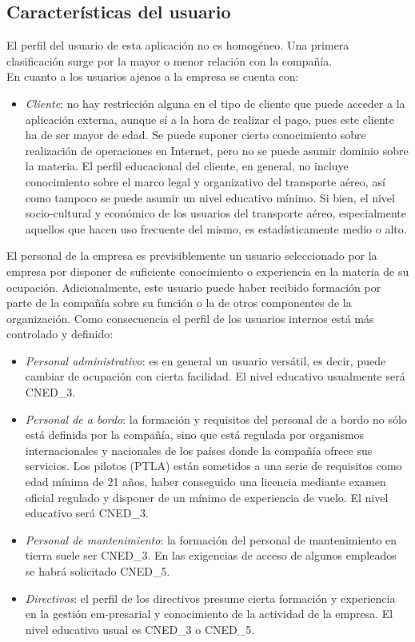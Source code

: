\documentclass[11pt, a4paper, twoside, titlepage]{article}
\begin{document}
		\subsection{Características del usuario}
			El perfil del usuario de esta aplicación no es homogéneo. Una primera clasificación surge por la mayor o menor relación con la compañía.\\
			En cuanto a los usuarios ajenos a la empresa se cuenta con:
	
			\begin{itemize}
				\item \textit{Cliente}: no hay restricción alguna en el tipo de cliente que puede acceder a la aplicación externa, aunque sí a la hora de realizar el pago, pues este cliente ha de ser mayor de edad. Se puede suponer cierto conocimiento sobre realización de operaciones en \gls{Internet}, pero no se puede asumir dominio sobre la materia. El perfil educacional del cliente, en general, no incluye conocimiento sobre el marco legal y organizativo del transporte aéreo, así como tampoco se puede asumir un nivel educativo mínimo. Si bien, el nivel socio-cultural y económico de los usuarios del transporte aéreo, especialmente aquellos que hacen uso frecuente del mismo, es estadísticamente medio o alto.
			\end{itemize}

			El personal de la empresa es previsiblemente un usuario seleccionado por la empresa por disponer de suficiente conocimiento o experiencia en la materia de su ocupación. Adicionalmente, este usuario puede haber recibido formación por parte de la compañía sobre su función o la de otros componentes de la organización. Como consecuencia el perfil de los usuarios internos está más controlado y definido:
			\begin{itemize}
				\item \textit{Personal administrativo}: es en general un usuario versátil, es decir, puede cambiar de ocupación con cierta facilidad. El nivel educativo usualmente será \gls{CNED_3}.
				\item \textit{Personal de a bordo}: la formación y requisitos del personal de a bordo no sólo está definida por la compañía, sino que está regulada por organismos internacionales y nacionales de los países donde la compañía ofrece sus servicios. Los pilotos  (\gls{PTLA}) están sometidos a una serie de requisitos como edad mínima de 21 años, haber conseguido una licencia mediante examen oficial regulado y disponer de un mínimo de experiencia de vuelo. El nivel educativo será \gls{CNED_3}.
				\item \textit{Personal de mantenimiento}: la formación del personal de mantenimiento en tierra suele ser \gls{CNED_3}. En las exigencias de acceso de algunos empleados se habrá solicitado \gls{CNED_5}.
				\item \textit{Directivos}: el perfil de los directivos presume cierta formación y experiencia en la gestión em-\break{}presarial y conocimiento de la actividad de la empresa. El nivel educativo usual es \gls{CNED_3} o \gls{CNED_5}.
			\end{itemize}
\end{document}
